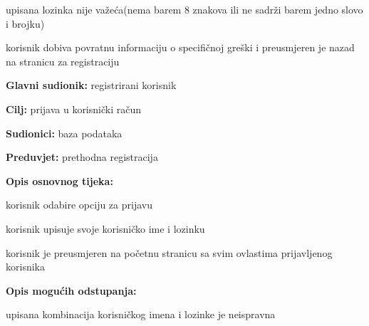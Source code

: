 \begin{packed_enum}
\begin{packed_item}
\begin{packed_item}
\begin{packed_enum}
								
							\end{packed_enum}
							\item[2.b] upisana lozinka nije važeća(nema barem 8 znakova ili ne sadrži barem jedno slovo i brojku)
							\begin{packed_enum}
								
								\item korisnik dobiva povratnu informaciju o specifičnoj greški i preusmjeren je nazad na stranicu za              registraciju
								
								
							\end{packed_enum}
							
						\end{packed_item}
					\end{packed_item}
					
					\noindent {}
					\begin{packed_item}
						
						\item \textbf{Glavni sudionik: }registrirani korisnik
						\item  \textbf{Cilj:} prijava u korisnički račun
						\item  \textbf{Sudionici:} baza podataka
						\item  \textbf{Preduvjet:} prethodna registracija
						\item  \textbf{Opis osnovnog tijeka:}
						
						\item[] \begin{packed_enum}
							
							\item korisnik odabire opciju za prijavu
							\item korisnik upisuje svoje korisničko ime i lozinku
							\item korisnik je preusmjeren na početnu stranicu sa svim ovlastima prijavljenog korisnika
						
						\end{packed_enum}
						
						\item  \textbf{Opis mogućih odstupanja:}
						
						\item[] \begin{packed_item}
							
							\item[2.a] upisana kombinacija korisničkog imena i lozinke je neispravna
							\item[] \begin{packed_enum}
								

\end{packed_enum}
\end{packed_item}
\end{packed_item}
\end{packed_enum}
